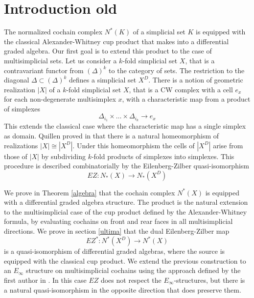 \section{Introduction old}

The normalized cochain complex $N^*(K)$ of a simplicial set $K$ is equipped with the classical Alexander-Whitney cup product that makes into a differential graded algebra.
Our first goal is to extend this product to the case of multisimplicial sets.
Let us consider a $k$-fold simplicial set $X$, that is a contravariant functor from $(\Delta)^k$ to the category of sets.
The restriction to the diagonal $\Delta \subset (\Delta)^k$ defines a simplicial set $X^D$.
There is a notion of geometric realization $|X|$ of a $k$-fold simplicial set $X$, that is a CW complex with a cell $e_x$ for each non-degenerate multisimplex $x$, with a characteristic map from a product of simplexes $$\Delta_{i_1} \times \dots \times \Delta_{i_k} \to e_x$$ This extends the classical case where the characteristic map has a single simplex as domain.
Quillen proved in \cite{Quillen} that there is a natural homeomorphism of realizations $|X| \cong |X^D|$.
Under this homeomorphism the cells of $|X^D|$ arise from those of $|X|$ by subdividing $k$-fold products of simplexes into simplexes.
This procedure is described combinatorially by the Eilenberg-Zilber quasi-isomorphism
$$EZ:N_*(X) \to N_*(X^D)$$


\medskip

We prove in Theorem \ref{algebra} %
that the cochain complex $N^*(X)$ is equipped with a differential graded algebra structure.
The product is the natural extension to the multisimplicial case of the cup product defined by the Alexander-Whitney formula, by
evaluating cochains on front and rear faces in all multisimplicial directions.
We prove in section \ref{ultima} that the dual Eilenberg-Zilber map
$$EZ^*:N^*(X^D) \to N^*(X)$$ %
is a quasi-isomorphism of differential graded algebras, where the source is equipped with the classical cup product.
We extend the previous construction to an $E_\infty$ structure on multisimplicial cochains using the approach defined by the first author in \cite{anibal}.
In this case $EZ$ does not respect the $E_\infty$-structures, but there is a natural quasi-isomorphism in the opposite direction that does preserve them.

